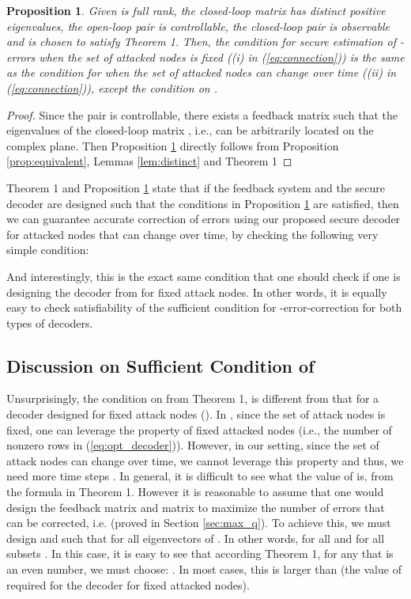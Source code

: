 \documentclass[journal]{IEEEtran}
\newtheorem{prop}{\bf{Proposition}}
\begin{document}
\begin{prop}\label{prop:equivalent2}
Given  is full rank, the closed-loop matrix  has  distinct positive eigenvalues, the open-loop pair  is controllable, the closed-loop pair  is observable and  is chosen to satisfy Theorem 1. Then, the condition for secure estimation of -errors when the set of attacked nodes is fixed ((i) in (\ref{eq:connection})) is the same as the condition for when the set of attacked nodes can change over time ((ii) in (\ref{eq:connection})), except the condition on .
\end{prop}
\begin{proof}
Since the pair  is controllable, there exists a feedback matrix  such that the eigenvalues of the closed-loop matrix , i.e.,  can be arbitrarily located on the complex plane. Then Proposition \ref{prop:equivalent2} directly follows from Proposition \ref{prop:equivalent}, Lemmas \ref{lem:distinct} and Theorem 1 
\end{proof}

Theorem 1 and Proposition \ref{prop:equivalent2} state that if the feedback system and the secure decoder are designed such that the conditions in Proposition \ref{prop:equivalent2} are satisfied, then we can guarantee accurate correction of  errors using our proposed secure decoder for attacked nodes that can change over time, by checking the following very simple condition:

And interestingly, this is the exact same condition that one should check if one is designing the decoder from \cite{Fawzi2014} for fixed attack nodes. In other words, it is equally easy to check satisfiability of the sufficient condition for -error-correction for both types of decoders.




\subsection{Discussion on Sufficient Condition of }

Unsurprisingly, the condition on  from Theorem 1, is different from that for a decoder designed for fixed attack nodes (). In \cite{Fawzi2014}, since the set of attack nodes is fixed, one can leverage the property of fixed attacked nodes (i.e., the number of nonzero rows in (\ref{eq:opt_decoder})). However, in our setting, since the set of attack nodes can change over time, we cannot leverage this property and thus, we need more time steps .
In general, it is difficult to see what the value of  is, from the formula in Theorem 1. However it is reasonable to assume that one would design the feedback matrix  and matrix  to maximize the number of errors that can be corrected, i.e.  (proved in Section \ref{sec:max_q}). To achieve this, we must design  and  such that  for all eigenvectors of . In other words,  for all  and for all subsets . 
In this case, it is easy to see that according Theorem 1, for any  that is an even number, we must choose: .
In most cases, this  is larger than  (the value of  required for the decoder for fixed attacked nodes).
\end{document}
